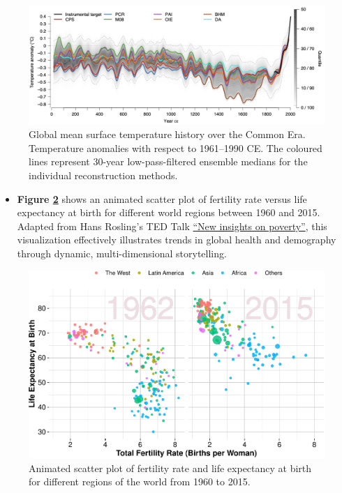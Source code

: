 \documentclass[
]{book}
\providecommand{\tightlist}{%
  \setlength{\itemsep}{0pt}\setlength{\parskip}{0pt}}
\theoremstyle{definition}
\theoremstyle{definition}
\theoremstyle{definition}
\theoremstyle{definition}
\theoremstyle{remark}
\begin{document}
\begin{figure}

{\centering \includegraphics[width=1\linewidth]{images/EDA_fig_1} 

}

\caption{Global mean surface temperature history over the Common Era. Temperature anomalies with respect to 1961–1990 CE. The coloured lines represent 30-year low-pass-filtered ensemble medians for the individual reconstruction methods.}\label{fig:EDA-fig-1}
\end{figure}

\begin{itemize}
\tightlist
\item
  \textbf{Figure \ref{fig:EDA-fig-2}} shows an animated scatter plot of fertility rate versus life expectancy at birth for different world regions between 1960 and 2015. Adapted from Hans Rosling's TED Talk \href{https://www.ted.com/talks/hans_rosling_new_insights_on_poverty?subtitle=en}{``New insights on poverty''}, this visualization effectively illustrates trends in global health and demography through dynamic, multi-dimensional storytelling.
\end{itemize}

\begin{figure}

{\centering \includegraphics[width=0.8\linewidth]{EDA_files/figure-latex/EDA-fig-2-1} 

}

\caption{Animated scatter plot of fertility rate and life expectancy at birth for different regions of the world from 1960 to 2015.}\label{fig:EDA-fig-2}
\end{figure}
\end{document}
